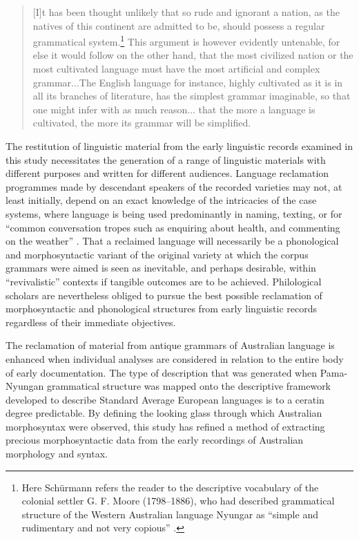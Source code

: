 \begin{quote}
[I]t has been thought unlikely that so rude and ignorant a nation, as the natives of this continent are admitted to be, should possess a regular grammatical system.\footnote{Here Schürmann refers the reader to the descriptive vocabulary of the colonial settler G. F. Moore (1798--1886), who had described grammatical structure of the Western Australian language Nyungar as “simple and rudimentary and not very copious” \citeyearpar[74]{moore_descriptive_1842}.} This argument is however evidently untenable, for else it would follow on the other hand, that the most civilized nation or the most cultivated language must have the most artificial and complex grammar...The English language for instance, highly cultivated as it is in all its branches of literature, has the simplest grammar imaginable, so that one might infer with as much reason... that the more a language is cultivated, the more its grammar will be simplified. \citep[v]{schurmann_letter_1844}
\end{quote}

The restitution of linguistic material from the early linguistic records examined in this study necessitates the generation of a range of linguistic materials with different purposes and written for different audiences. Language reclamation programmes made by descendant speakers of the recorded varieties may not, at least initially, depend on an exact knowledge of the intricacies of the case systems, where language is being used predominantly in naming, texting, or for “common conversation tropes such as enquiring about health, and commenting on the weather” \citep{blake_nineteenth-century_2016}. That a reclaimed language will necessarily be a phonological and morphosyntactic variant of the original variety at which the corpus grammars were aimed is seen as inevitable, and perhaps desirable, within “revivalistic” contexts if tangible outcomes are to be achieved. Philological scholars are nevertheless obliged to pursue the best possible reclamation of morphosyntactic and phonological structures from early linguistic records regardless of their immediate objectives.

The reclamation of material from antique grammars of Australian language is enhanced when individual analyses are considered in relation to the entire body of early documentation. The type of description that was generated when Pama-Nyungan grammatical structure was mapped onto the descriptive framework developed to describe Standard Average European languages is to a ceratin degree predictable. By defining the looking glass through which Australian morphosyntax were observed, this study has refined a method of extracting precious morphosyntactic data from the early recordings of Australian morphology and syntax.
